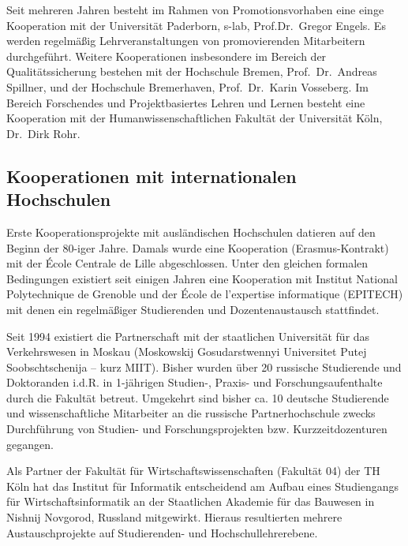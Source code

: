Seit mehreren Jahren besteht im Rahmen von Promotionsvorhaben eine einge
Kooperation mit der Universität Paderborn, s-lab, Prof.Dr.~Gregor
Engels. Es werden regelmäßig Lehrveranstaltungen von promovierenden
Mitarbeitern durchgeführt. Weitere Kooperationen insbesondere im Bereich
der Qualitätssicherung bestehen mit der Hochschule Bremen,
Prof.~Dr.~Andreas Spillner, und der Hochschule Bremerhaven,
Prof.~Dr.~Karin Vosseberg. Im Bereich Forschendes und Projektbasiertes
Lehren und Lernen besteht eine Kooperation mit der
Humanwissenschaftlichen Fakultät der Universität Köln, Dr.~Dirk Rohr.

\subsection{Kooperationen mit internationalen
Hochschulen\label{/mi-2017/selbstbericht/0700-studiengangsbezogene-kooperationen/0000-studiengangsbezogene-kooperationen}}\label{kooperationen-mit-internationalen-hochschulenpathlabelmi-2017selbstbericht0700-studiengangsbezogene-kooperationen0000-studiengangsbezogene-kooperationen}

Erste Kooperationsprojekte mit ausländischen Hochschulen datieren auf
den Beginn der 80-iger Jahre. Damals wurde eine Kooperation
(Erasmus-Kontrakt) mit der École Centrale de Lille abgeschlossen. Unter
den gleichen formalen Bedingungen existiert seit einigen Jahren eine
Kooperation mit Institut National Polytechnique de Grenoble und der
École de l'expertise informatique (EPITECH) mit denen ein regelmäßiger
Studierenden und Dozentenaustausch stattfindet.

Seit 1994 existiert die Partnerschaft mit der staatlichen Universität
für das Verkehrswesen in Moskau (Moskowskij Gosudarstwennyi Universitet
Putej Soobschtschenija -- kurz MIIT). Bisher wurden über 20 russische
Studierende und Doktoranden i.d.R. in 1-jährigen Studien-, Praxis- und
Forschungsaufenthalte durch die Fakultät betreut. Umgekehrt sind bisher
ca. 10 deutsche Studierende und wissenschaftliche Mitarbeiter an die
russische Partnerhochschule zwecks Durchführung von Studien- und
Forschungsprojekten bzw. Kurzzeitdozenturen gegangen.

Als Partner der Fakultät für Wirtschaftswissenschaften (Fakultät 04) der
TH Köln hat das Institut für Informatik entscheidend am Aufbau eines
Studiengangs für Wirtschaftsinformatik an der Staatlichen Akademie für
das Bauwesen in Nishnij Novgorod, Russland mitgewirkt. Hieraus
resultierten mehrere Austauschprojekte auf Studierenden- und
Hochschullehrerebene.


